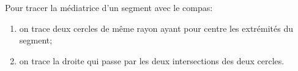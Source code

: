 Pour tracer la médiatrice d'un segment avec le compas:
\begin{enumerate}
    \item on trace deux cercles de même rayon ayant pour centre les extrémités
    du segment;
    \item on trace la droite qui passe par les deux intersections des deux cercles.
\end{enumerate}